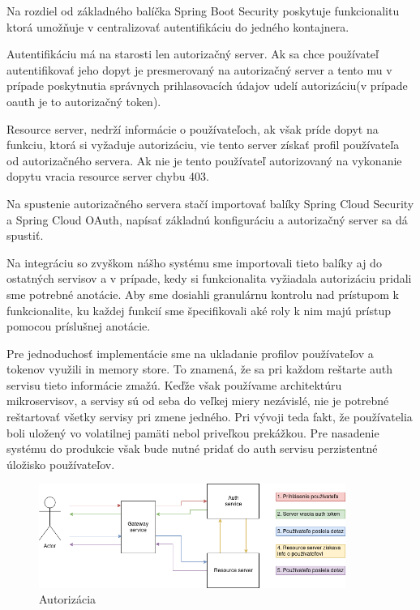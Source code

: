 Na rozdiel od základného balíčka Spring Boot Security poskytuje funkcionalitu ktorá umožňuje v centralizovať autentifikáciu do jedného kontajnera.  

Autentifikáciu má na starosti len autorizačný server. Ak sa chce používateľ autentifikovať jeho dopyt je presmerovaný na autorizačný server a tento mu v prípade poskytnutia správnych prihlasovacích údajov udelí autorizáciu(v prípade \acrshort{oauth} je to autorizačný token).   

Resource server, nedrží informácie o používateľoch, ak však príde dopyt na funkciu, ktorá si vyžaduje autorizáciu, vie tento server získať profil používateľa od autorizačného servera. Ak nie je tento používateľ autorizovaný na vykonanie dopytu vracia resource server chybu 403. 

Na spustenie autorizačného servera stačí importovať balíky  Spring Cloud Security a Spring Cloud OAuth, napísať základnú konfiguráciu a autorizačný server sa dá spustiť.   

Na integráciu so zvyškom nášho systému sme importovali tieto balíky aj do ostatných servisov a v prípade, kedy si funkcionalita vyžiadala autorizáciu  pridali sme potrebné anotácie. Aby sme dosiahli granulárnu kontrolu nad prístupom k funkcionalite, ku každej funkcií sme špecifikovali aké roly k nim majú prístup pomocou príslušnej anotácie.  

Pre jednoduchosť implementácie sme na ukladanie profilov používateľov a tokenov využili in memory store. To znamená, že sa pri každom reštarte auth servisu tieto informácie zmažú. Keďže však používame architektúru mikroservisov, a servisy sú od seba do veľkej miery nezávislé, nie je potrebné reštartovať všetky servisy pri zmene jedného. Pri vývoji teda fakt, že používatelia boli uložený vo volatilnej pamäti nebol priveľkou prekážkou. Pre nasadenie systému do produkcie však bude nutné pridať do auth servisu perzistentné úložisko používateľov.   


\begin{figure}[!htbp] 
	\centering 
	\includegraphics[width=10cm]{img/auth_operation.png} 
	\caption{Autorizácia} 
	\label{auth_operation} 
\end{figure}  

